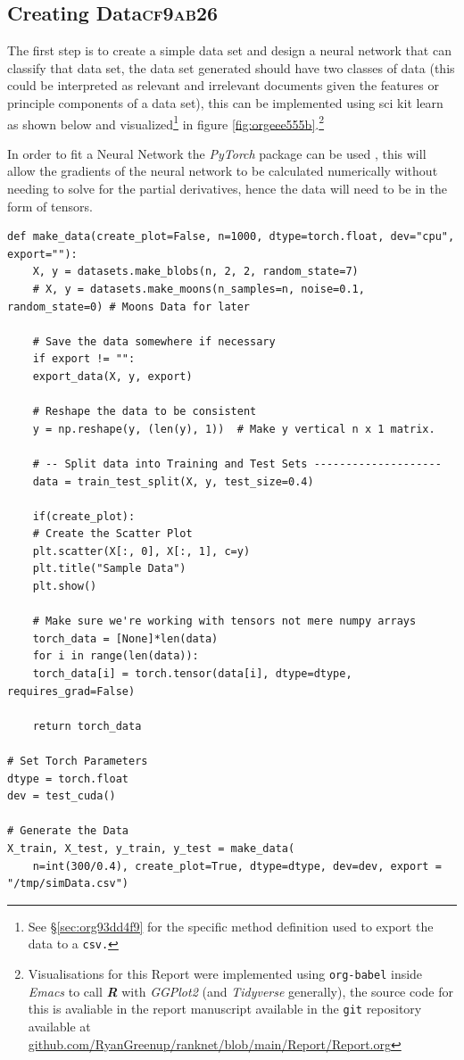 \documentclass[a4paper,11pt,twoside]{article}
\begin{document}
\subsection{Creating Data\hfill{}\textsc{cf9ab26}}
\label{sec:org6bd8d6d}
The first step is to create a simple data set and design a neural
network that can classify that data set, the data set generated
should have two classes of data (this could be interpreted as
relevant and irrelevant documents given the features or principle
components of a data set), this can be implemented using sci kit
learn as shown below and visualized\footnote{See \S \ref{sec:org93dd4f9} for the specific method definition used to
export the data to a \texttt{csv.}} in figure \ref{fig:orgeee555b}.\footnote{Visualisations for this Report were implemented using
\texttt{org-babel} \cite{dominikOrgModeReference2018} inside \emph{Emacs}
\cite{stallmanGNUEmacsManual2002} to call \textbf{\emph{R}}
\cite{rcoreteamLanguageEnvironmentStatistical2021} with \emph{GGPlot2}
\cite{wickhamGgplot2ElegantGraphics2016a} (and \emph{Tidyverse}
\cite{wickhamWelcomeTidyverse2019} generally), the source code for this
is avaliable in the report manuscript available in the \texttt{git} repository
available at \href{https://github.com/RyanGreenup/ranknet/blob/main/Report/Report.org}{github.com/RyanGreenup/ranknet/blob/main/Report/Report.org}}


In order to fit a Neural Network the \emph{PyTorch} package can be used
\cite{NEURIPS2019_9015}, this will allow the gradients of the neural
network to be calculated numerically without needing to solve for
the partial derivatives, hence the data will need to be in the
form of tensors.

\begin{verbatim}
def make_data(create_plot=False, n=1000, dtype=torch.float, dev="cpu", export=""):
    X, y = datasets.make_blobs(n, 2, 2, random_state=7)
    # X, y = datasets.make_moons(n_samples=n, noise=0.1, random_state=0) # Moons Data for later

    # Save the data somewhere if necessary
    if export != "":
	export_data(X, y, export)

    # Reshape the data to be consistent
    y = np.reshape(y, (len(y), 1))  # Make y vertical n x 1 matrix.

    # -- Split data into Training and Test Sets --------------------
    data = train_test_split(X, y, test_size=0.4)

    if(create_plot):
	# Create the Scatter Plot
	plt.scatter(X[:, 0], X[:, 1], c=y)
	plt.title("Sample Data")
	plt.show()

    # Make sure we're working with tensors not mere numpy arrays
    torch_data = [None]*len(data)
    for i in range(len(data)):
	torch_data[i] = torch.tensor(data[i], dtype=dtype, requires_grad=False)

    return torch_data

# Set Torch Parameters
dtype = torch.float
dev = test_cuda()

# Generate the Data
X_train, X_test, y_train, y_test = make_data(
    n=int(300/0.4), create_plot=True, dtype=dtype, dev=dev, export = "/tmp/simData.csv")
\end{verbatim}
\end{document}
